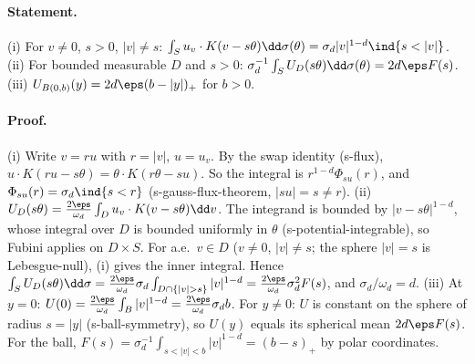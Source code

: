 \paragraph{Statement.} (i) For $v\neq0$, $s>0$, $|v|\neq s$: $\int_Su_v\cdot K(v-s\theta)\dd\sigma(\theta)=\sigma_d|v|^{1-d}\ind\{s<|v|\}$.
(ii) For bounded measurable $D$ and $s>0$: $\sigma_d^{-1}\int_SU_D(s\theta)\dd\sigma(\theta)=2d\eps F(s)$.
(iii) $U_{B(0,b)}(y)=2d\eps(b-|y|)_+$ for $b>0$.
\paragraph{Proof.} (i) Write $v=ru$ with $r=|v|$, $u=u_v$. By the swap identity (s-flux), $u\cdot K(ru-s\theta)=\theta\cdot K(r\theta-su)$. So the
integral is $r^{1-d}\Phi_{su}(r)$, and $\Phi_{su}(r)=\sigma_d\ind\{s<r\}$ (s-gauss-flux-theorem, $|su|=s\neq r$).
(ii) $U_D(s\theta)=\frac{2\eps}{\omega_d}\int_Du_v\cdot K(v-s\theta)\dd v$. The integrand is bounded by $|v-s\theta|^{1-d}$, whose
integral over $D$ is bounded uniformly in $\theta$ (s-potential-integrable), so Fubini applies on $D\times S$. For a.e.\ $v\in D$
($v\neq0$, $|v|\neq s$; the sphere $|v|=s$ is Lebesgue-null), (i) gives the inner integral. Hence
$\int_SU_D(s\theta)\dd\sigma=\frac{2\eps}{\omega_d}\sigma_d\int_{D\cap\{|v|>s\}}|v|^{1-d}=\frac{2\eps}{\omega_d}\sigma_d^2F(s)$, and
$\sigma_d/\omega_d=d$. (iii) At $y=0$: $U(0)=\frac{2\eps}{\omega_d}\int_{B}|v|^{1-d}=\frac{2\eps}{\omega_d}\sigma_db$. For $y\neq0$: $U$ is
constant on the sphere of radius $s=|y|$ (s-ball-symmetry), so $U(y)$ equals its spherical mean $2d\eps F(s)$. For
the ball, $F(s)=\sigma_d^{-1}\int_{s<|v|<b}|v|^{1-d}=(b-s)_+$ by polar coordinates.
